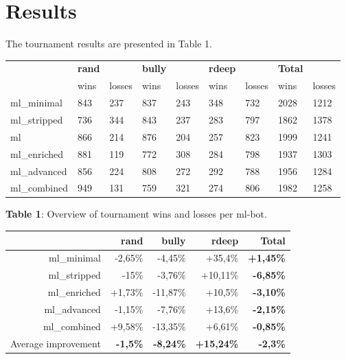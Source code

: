 \documentclass[a4paper,11pt]{article}
\begin{document}
\section{Results}
The tournament results are presented in Table 1. 

\setlength{\leftmargin}{0pt}
\begin{center}
  \begin{tabular}{ | l | l l | l l | l l | |l l | }
     \hline
      & \textbf{rand} & & \textbf{bully} & & \textbf{rdeep} & & \textbf{Total} & \\
      & wins & losses & wins & losses & wins & losses  & wins & losses \\ \hline
      ml\_minimal & 843 & 237 & 837 & 243 & 348 & 732 & 2028 & 1212 \\ \hline
      ml\_stripped & 736 & 344 & 843 & 237 & 283 & 797 & 1862 & 1378 \\ \hline
      ml & 866 & 214 & 876 & 204 & 257 & 823 & 1999 & 1241 \\ \hline 
      ml\_enriched & 881 & 119 & 772 & 308 & 284 & 798 & 1937 & 1303 \\ \hline
      ml\_advanced  & 856 & 224 & 808 & 272 & 292 & 788 & 1956 & 1284 \\ \hline
      ml\_combined & 949 & 131 & 759 & 321 & 274 & 806  & 1982 & 1258\\ \hline
  \end{tabular}
\end{center}
\textbf{Table 1}: Overview of tournament wins and losses per ml-bot. \\

\begin{center}
\begin{tabular}{| r | r | r | r || r |}
\hline
      & \textbf{rand} & \textbf{bully} & \textbf{rdeep} & \textbf{Total} \\ \hline
      ml\_minimal & -2,65\% & -4,45\% & +35,4\% & \textbf{+1,45\%}   \\ \hline
      ml\_stripped & -15\% & -3,76\% & +10,11\% & \textbf{-6,85\%}  \\ \hline
      ml\_enriched & +1,73\% & -11,87\% & +10,5\% & \textbf{-3,10\%} \\ \hline
      ml\_advanced & -1,15\% & -7,76\% & +13,6\%& \textbf{-2,15\%}  \\ \hline
      ml\_combined & +9,58\% & -13,35\% & +6,61\% & \textbf{-0,85\%}  \\ \hline \hline
      Average improvement & \textbf{-1,5\%} & \textbf{-8,24\%} & \textbf{+15,24\%} &\textbf{-2,3\%} \\ \hline
\end{tabular} \\
\end{center}
\end{document}
